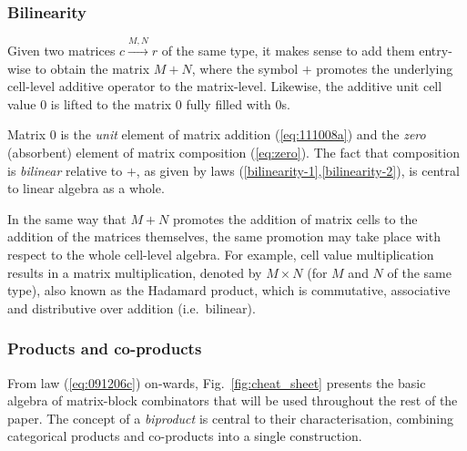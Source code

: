 \documentclass[sigplan]{acmart}\settopmatter{}
\def\doc{paper}
\begin{document}
\subsubsection{Bilinearity}
Given two matrices $c \xrightarrow{M, N} r$ of the same type, it makes sense to add them entry-wise to obtain the matrix $M+N$, where the symbol $+$ promotes the underlying cell-level additive operator to the matrix-level. Likewise, the additive unit cell value $0$ is lifted to the matrix $0$ fully filled with $0$s.

Matrix $0$ is the \emph{unit} element of matrix addition (\ref{eq:111008a}) and the \emph{zero} (absorbent) element of matrix composition (\ref{eq:zero}).
The fact that composition is \emph{bilinear} relative to $+$, as given by laws (\ref{bilinearity-1},\ref{bilinearity-2}), is central to linear algebra as a whole.

In the same way that $M + N$ promotes the addition of matrix cells to the addition of the matrices themselves, the same promotion may take place with respect to the whole cell-level algebra. For example, cell value multiplication results in a matrix multiplication, denoted by $M \times N$
(for $M$ and $N$ of the same type), also known as the Hadamard product, which is commutative, associative and distributive over addition (i.e.\ bilinear).

\subsubsection{Products and co-products}\label{laop-laws}

From law (\ref{eq:091206c}) on-wards, Fig.~\ref{fig:cheat_sheet} presents the basic algebra of matrix-block combinators that will be used throughout the rest of the \doc. The concept of a \emph{biproduct} is central to their characterisation,
combining categorical products and co-products into a single construction.
\end{document}

